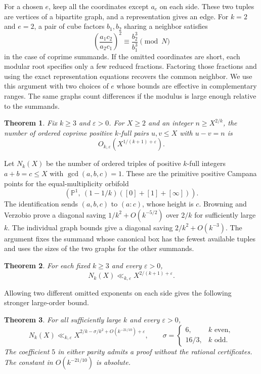 \documentclass[11pt,reqno]{amsart}
\newtheorem{theorem}{Theorem}
\newcommand{\eps}{\varepsilon}
\begin{document}
For a chosen \(e\), keep all the coordinates except \(a_e\) on each side.
These two tuples are vertices of a bipartite graph, and a representation
gives an edge. For \(k=2\) and \(e=2\), a pair of cube factors \(b_1,b_2\)
sharing a neighbor satisfies
\[
\left(\frac{a_1c_2}{a_2c_1}\right)^2\equiv \frac{b_2^3}{b_1^3}\pmod N
\]
in the case of coprime summands. If the omitted coordinates are short,
each modular root specifies only a few reduced fractions. Factoring
those fractions and using the exact representation equations recovers
the common neighbor. We use this argument with two choices of \(e\) whose
bounds are effective in complementary ranges. The same graphs count
differences if the modulus is large enough relative to the summands.

\begin{theorem}\label{thm:difference}
Fix \(k\ge3\) and \(\eps>0\). For \(X\ge2\) and an integer
\(n\ge X^{2/k}\), the number of ordered coprime positive \(k\)-full pairs
\(u,v\le X\) with \(u-v=n\) is
\[
                         O_{k,\eps}(X^{1/(k+1)+\eps}).
\]
\end{theorem}

Let \(N_k(X)\) be the number of ordered triples of positive \(k\)-full
integers \(a+b=c\le X\) with \(\gcd(a,b,c)=1\). These are the primitive
positive Campana points for the equal-multiplicity orbifold
\[
\left(\mathbb P^1,\ (1-1/k)([0]+[1]+[\infty])\right).
\]
The identification sends \((a,b,c)\) to \((a:c)\), whose height is \(c\).
Browning and Verzobio \cite[Theorem~1.1]{BV} prove a diagonal saving
\(1/k^2+O(k^{-5/2})\) over \(2/k\) for sufficiently large \(k\).
The individual graph bounds give a diagonal saving
\(2/k^2+O(k^{-3})\). The argument fixes the summand whose canonical
box has the fewest available tuples and uses the sizes of the
two graphs for the other summands.

\begin{theorem}\label{thm:campana}
For each fixed \(k\ge3\) and every \(\eps>0\),
\[
                         N_k(X)\ll_{k,\eps}X^{2/(k+1)+\eps}.
\]
\end{theorem}

Allowing two different omitted exponents on each side gives the
following stronger large-order bound.

\begin{theorem}\label{thm:two-power-diagonal}
For all sufficiently large \(k\) and every \(\eps>0\),
\[
 N_k(X)\ll_{k,\eps} X^{2/k-\sigma/k^2+O(k^{-21/10})+\eps},
 \qquad
 \sigma=\begin{cases}
 6,& k\text{ even},\\
 16/3,& k\text{ odd}.
 \end{cases}
\]
The coefficient \(5\) in either parity admits a proof without
the rational certificates. The constant in \(O(k^{-21/10})\)
is absolute.
\end{theorem}
\end{document}
